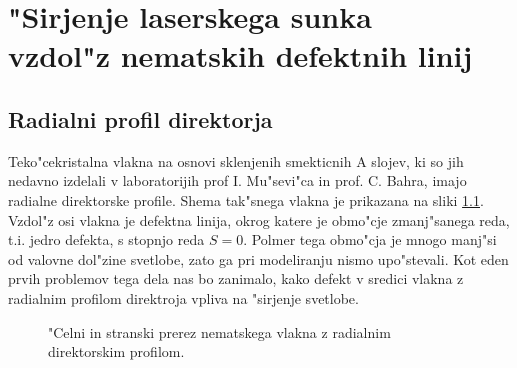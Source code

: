 \documentclass[12pt,twoside,openright,final]{report}
\begin{document}
\chapter["Sirjenje laserskega sunka vzdol"z nematskih defektnih linij]{\texorpdfstring{"Sirjenje laserskega sunka \\[.3cm] vzdol"z nematskih defektnih linij}{"Sirjenje laserskega sunka vzdol"z nematskih defektnih linij}}

\section{Radialni profil direktorja}

Teko"cekristalna vlakna na osnovi sklenjenih smekticnih A slojev, ki so jih nedavno izdelali v laboratorijih prof I. Mu"sevi"ca in prof. C. Bahra\cite{peddireddy}, imajo radialne direktorske profile. 
Shema tak"snega vlakna je prikazana na sliki \ref{fig:fibre-radial-profile}. 
Vzdol"z osi vlakna je defektna linija, okrog katere je obmo"cje zmanj"sanega reda, t.i. jedro defekta, s stopnjo reda $S=0$. 
Polmer tega obmo"cja je mnogo manj"si od valovne dol"zine svetlobe, zato ga pri modeliranju nismo upo"stevali. 
Kot eden prvih problemov tega dela nas bo zanimalo, kako defekt v sredici vlakna z radialnim profilom direktroja vpliva na "sirjenje svetlobe. 
\begin{figure}[!ht]
\centering
{}
\caption{"Celni in stranski prerez nematskega vlakna z radialnim direktorskim profilom. }
\label{fig:fibre-radial-profile}
\end{figure}
\end{document}
